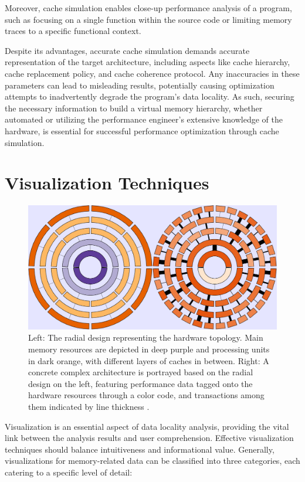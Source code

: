 Moreover, cache simulation enables close-up performance analysis of a program, such as focusing on a single function within the source code or limiting memory traces to a specific functional context.

Despite its advantages, accurate cache simulation demands accurate representation of the target architecture, including aspects like cache hierarchy, cache replacement policy, and cache coherence protocol. Any inaccuracies in these parameters can lead to misleading results, potentially causing optimization attempts to inadvertently degrade the program's data locality. As such, securing the necessary information to build a virtual memory hierarchy, whether automated or utilizing the performance engineer's extensive knowledge of the hardware, is essential for successful performance optimization through cache simulation.

\section{Visualization Techniques}\label{sec:visualization}
\begin{figure}
	\centering
	\includegraphics[width=\linewidth]{pictures/memaxes_cache.png}
	\caption{Left: The radial design representing the hardware topology. Main memory resources are depicted in deep purple and processing units in dark orange, with different layers of caches in between. Right: A concrete complex architecture is portrayed based on the radial design on the left, featuring performance data tagged onto the hardware resources through a color code, and transactions among them indicated by line thickness \cite{gimenez2017memaxes}.}
	\label{fig:memaxes_cache}
\end{figure}

Visualization is an essential aspect of data locality analysis, providing the vital link between the analysis results and user comprehension. Effective visualization techniques should balance intuitiveness and informational value. Generally, visualizations for memory-related data can be classified into three categories, each catering to a specific level of detail:

